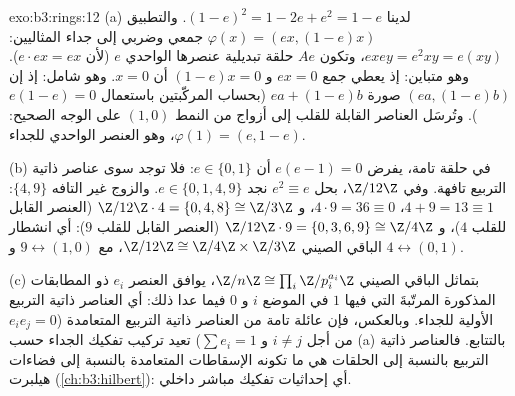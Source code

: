 \begin{solution}{exo:b3:rings:12}
(a) لدينا $(1-e)^2 = 1 - 2e + e^2 = 1 - e$. والتطبيق $\varphi(x) =
(ex, (1-e)x)$ جمعي وضربي إلى جداء
المثاليين: $exey = e^2xy = e(xy)$، وتكون $Ae$ حلقة تبديلية عنصرها الواحدي $e$
(لأن $e\cdot ex = ex$). وهو متباين: إذ يعطي جمع $ex = 0$
و $(1-e)x = 0$ أن $x = 0$. وهو شامل: إذ إن $(ea,
(1-e)b)$ صورة
$ea + (1-e)b$ (بحساب المركّبتين باستعمال $e(1-e) = 0$). وتُرسَل
العناصر القابلة للقلب إلى أزواج من النمط $(1, 0)$ على الوجه
الصحيح: $\varphi(1) = (e, 1-e)$، وهو العنصر الواحدي للجداء.

(b) في حلقة تامة، يفرض $e(e - 1) = 0$ أن $e \in \{0, 1\}$: فلا
توجد سوى عناصر ذاتية التربيع تافهة. وفي $\Z/12\Z$، بحل
$e^2 \equiv e$ نجد $e
\in \{0, 1, 4, 9\}$. والزوج غير التافه $\{4, 9\}$:
$4 + 9 =
13 \equiv 1$، $4\cdot9 = 36 \equiv 0$، و $\Z/12\Z\cdot4 =
\{0, 4, 8\} \cong \Z/3\Z$ (العنصر القابل للقلب $4$)،
و $\Z/12\Z\cdot9 = \{0,
3, 6, 9\} \cong \Z/4\Z$ (العنصر القابل للقلب $9$): أي انشطار الباقي الصيني
$\Z/12\Z \cong \Z/4\Z\times\Z/3\Z$، مع $9 \leftrightarrow
(1, 0)$ و $4 \leftrightarrow (0, 1)$.

(c) بتماثل الباقي الصيني $\Z/n\Z \cong \prod_i
\Z/p_i^{a_i}\Z$، يوافق العنصر $e_i$ ذو
المطابقات المذكورة المرتّبةَ التي فيها $1$ في الموضع $i$ و $0$
فيما عدا ذلك: أي العناصر ذاتية التربيع الأولية للجداء. وبالعكس،
فإن عائلة تامة من العناصر ذاتية التربيع المتعامدة ($e_ie_j = 0$
من أجل $i \neq j$ و $\sum e_i = 1$) تعيد تركيب تفكيك الجداء
حسب (a) بالتتابع. فالعناصر ذاتية التربيع بالنسبة إلى الحلقات هي
ما تكونه الإسقاطات المتعامدة بالنسبة إلى فضاءات هيلبرت
(\cref{ch:b3:hilbert}): أي إحداثيات تفكيك مباشر داخلي.
\end{solution}

